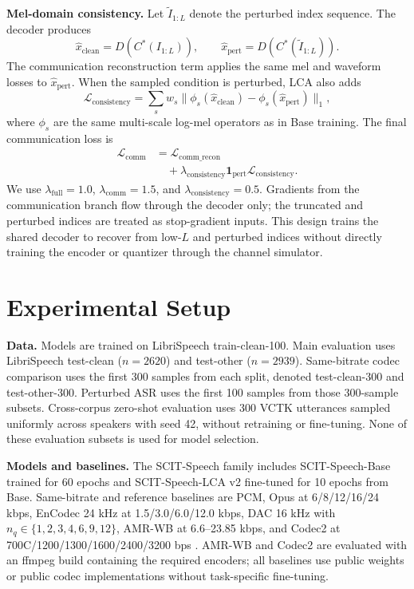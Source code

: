 ﻿\documentclass[conference]{IEEEtran}
\newcommand{\method}{SCIT-Speech}
\newcommand{\base}{SCIT-Speech-Base}
\newcommand{\lca}{SCIT-Speech-LCA}
\newcommand{\codebook}{C^\ast}
\begin{document}
\textbf{Mel-domain consistency.}
Let \(\tilde{I}_{1:L}\) denote the perturbed index sequence. The decoder produces
\[
\hat{x}_{\mathrm{clean}}=D(\codebook(I_{1:L})),\qquad
\hat{x}_{\mathrm{pert}}=D(\codebook(\tilde{I}_{1:L})).
\]
The communication reconstruction term applies the same mel and waveform losses to \(\hat{x}_{\mathrm{pert}}\). When the sampled condition is perturbed, LCA also adds
\[
\mathcal{L}_{\mathrm{consistency}} =
\sum_s w_s \|\phi_s(\hat{x}_{\mathrm{clean}})-\phi_s(\hat{x}_{\mathrm{pert}})\|_1,
\]
where \(\phi_s\) are the same multi-scale log-mel operators as in Base training. The final communication loss is
\[
\begin{aligned}
\mathcal{L}_{\mathrm{comm}} &=
\mathcal{L}_{\mathrm{comm\_recon}} \\
&\quad + \lambda_{\mathrm{consistency}}\mathbf{1}_{\mathrm{pert}}
\mathcal{L}_{\mathrm{consistency}} .
\end{aligned}
\]
We use \(\lambda_{\mathrm{full}}=1.0\), \(\lambda_{\mathrm{comm}}=1.5\), and \(\lambda_{\mathrm{consistency}}=0.5\). Gradients from the communication branch flow through the decoder only; the truncated and perturbed indices are treated as stop-gradient inputs. This design trains the shared decoder to recover from low-\(L\) and perturbed indices without directly training the encoder or quantizer through the channel simulator.

\section{Experimental Setup}

\textbf{Data.}
Models are trained on LibriSpeech train-clean-100. Main evaluation uses LibriSpeech test-clean (\(n=2620\)) and test-other (\(n=2939\)). Same-bitrate codec comparison uses the first 300 samples from each split, denoted test-clean-300 and test-other-300. Perturbed ASR uses the first 100 samples from those 300-sample subsets. Cross-corpus zero-shot evaluation uses 300 VCTK utterances sampled uniformly across speakers with seed 42, without retraining or fine-tuning. None of these evaluation subsets is used for model selection.

\textbf{Models and baselines.}
The \method{} family includes \base{} trained for 60 epochs and \lca{} v2 fine-tuned for 10 epochs from Base. Same-bitrate and reference baselines are PCM, Opus at 6/8/12/16/24 kbps, EnCodec 24 kHz at 1.5/3.0/6.0/12.0 kbps, DAC 16 kHz with \(n_q\in\{1,2,3,4,6,9,12\}\), AMR-WB at 6.6--23.85 kbps, and Codec2 at 700C/1200/1300/1600/2400/3200 bps \cite{valin2012opus,defossez2022encodec,kumar2023dac,itu2002amrwb,codec2repo}. AMR-WB and Codec2 are evaluated with an ffmpeg build containing the required encoders; all baselines use public weights or public codec implementations without task-specific fine-tuning.
\end{document}

